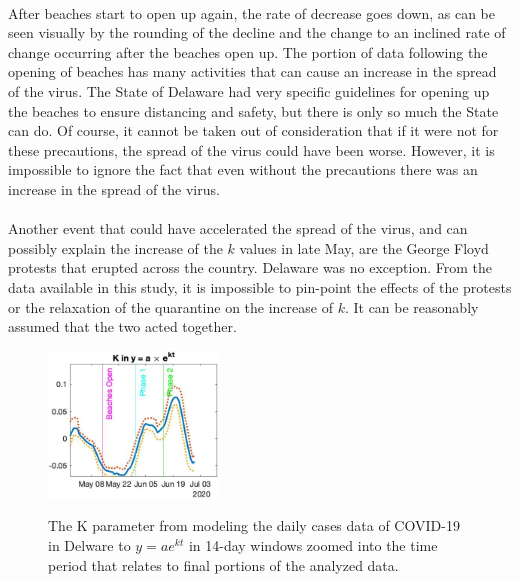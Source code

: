 \documentclass[12pt]{article}
\begin{document}
\paragraph{} After beaches start to open up again, the rate of decrease goes down, as can be seen visually by the rounding of the decline and the change to an inclined rate of change occurring after the beaches open up. The portion of data following the opening of beaches has many activities that can cause an increase in the spread of the virus. The State of Delaware had very specific guidelines for opening up the beaches to ensure distancing and safety, but there is only so much the State can do. Of course, it cannot be taken out of consideration that if it were not for these precautions, the spread of the virus could have been worse. However, it is impossible to ignore the fact that even without the precautions there was an increase in the spread of the virus.

\paragraph{} Another event that could have accelerated the spread of the virus, and can possibly explain the increase of the $k$ values in late May, are the George Floyd protests that erupted across the country. Delaware was no exception. From the data available in this study, it is impossible to pin-point the effects of the protests or the relaxation of the quarantine on the increase of $k$. It can be reasonably assumed that the two acted together.

\begin{figure}[h]
  \centering
  \subfigure
    \includegraphics[width=0.4\textwidth]{Figure10.jpg}%
    \label{fig:a}%
  \caption{The K parameter from modeling the daily cases data of COVID-19 in Delware to $y=ae^{kt}$ in 14-day windows zoomed into the time period that relates to final portions of the analyzed data.}
  \label{fig:10}
\end{figure}
\end{document}
